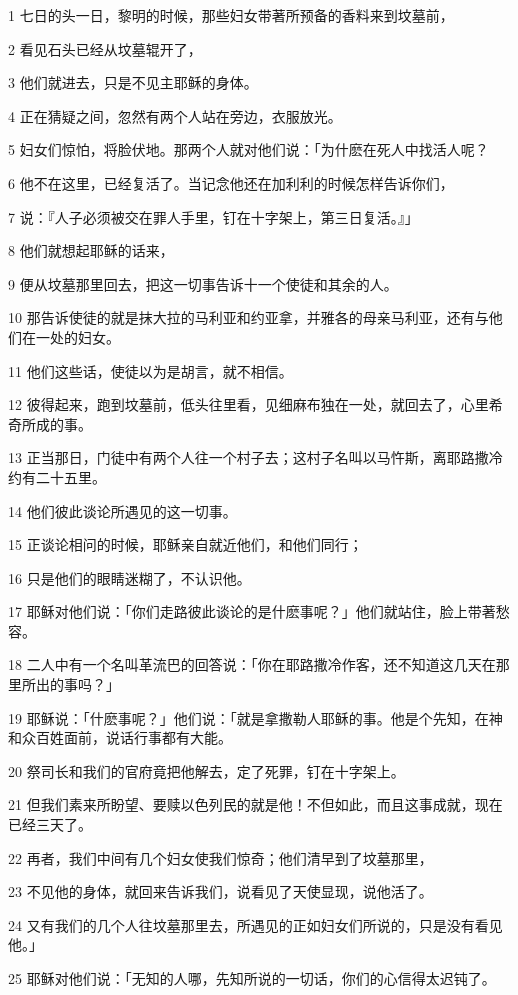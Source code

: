 \par 1 七日的头一日，黎明的时候，那些妇女带著所预备的香料来到坟墓前，
\par 2 看见石头已经从坟墓辊开了，
\par 3 他们就进去，只是不见主耶稣的身体。
\par 4 正在猜疑之间，忽然有两个人站在旁边，衣服放光。
\par 5 妇女们惊怕，将脸伏地。那两个人就对他们说：「为什麽在死人中找活人呢？
\par 6 他不在这里，已经复活了。当记念他还在加利利的时候怎样告诉你们，
\par 7 说：『人子必须被交在罪人手里，钉在十字架上，第三日复活。』」
\par 8 他们就想起耶稣的话来，
\par 9 便从坟墓那里回去，把这一切事告诉十一个使徒和其余的人。
\par 10 那告诉使徒的就是抹大拉的马利亚和约亚拿，并雅各的母亲马利亚，还有与他们在一处的妇女。
\par 11 他们这些话，使徒以为是胡言，就不相信。
\par 12 彼得起来，跑到坟墓前，低头往里看，见细麻布独在一处，就回去了，心里希奇所成的事。
\par 13 正当那日，门徒中有两个人往一个村子去；这村子名叫以马忤斯，离耶路撒冷约有二十五里。
\par 14 他们彼此谈论所遇见的这一切事。
\par 15 正谈论相问的时候，耶稣亲自就近他们，和他们同行；
\par 16 只是他们的眼睛迷糊了，不认识他。
\par 17 耶稣对他们说：「你们走路彼此谈论的是什麽事呢？」他们就站住，脸上带著愁容。
\par 18 二人中有一个名叫革流巴的回答说：「你在耶路撒冷作客，还不知道这几天在那里所出的事吗？」
\par 19 耶稣说：「什麽事呢？」他们说：「就是拿撒勒人耶稣的事。他是个先知，在神和众百姓面前，说话行事都有大能。
\par 20 祭司长和我们的官府竟把他解去，定了死罪，钉在十字架上。
\par 21 但我们素来所盼望、要赎以色列民的就是他！不但如此，而且这事成就，现在已经三天了。
\par 22 再者，我们中间有几个妇女使我们惊奇；他们清早到了坟墓那里，
\par 23 不见他的身体，就回来告诉我们，说看见了天使显现，说他活了。
\par 24 又有我们的几个人往坟墓那里去，所遇见的正如妇女们所说的，只是没有看见他。」
\par 25 耶稣对他们说：「无知的人哪，先知所说的一切话，你们的心信得太迟钝了。
